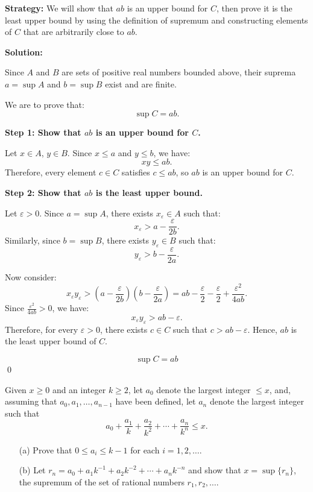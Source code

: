 \noindent\textbf{Strategy:} We will show that $ab$ is an upper bound for $C$, then prove it is the least upper bound by using the definition of supremum and constructing elements of $C$ that are arbitrarily close to $ab$.

\bigskip\noindent\textbf{Solution:}

Since \( A \) and \( B \) are sets of positive real numbers bounded above, their suprema \( a = \sup A \) and \( b = \sup B \) exist and are finite.

We are to prove that:
\[
\sup C = ab.
\]

\textbf{Step 1: Show that \( ab \) is an upper bound for \( C \).}

Let \( x \in A \), \( y \in B \). Since \( x \leq a \) and \( y \leq b \), we have:
\[
xy \leq ab.
\]
Therefore, every element \( c \in C \) satisfies \( c \leq ab \), so \( ab \) is an upper bound for \( C \).

\textbf{Step 2: Show that \( ab \) is the least upper bound.}

Let \( \varepsilon > 0 \). Since \( a = \sup A \), there exists \( x_\varepsilon \in A \) such that:
\[
x_\varepsilon > a - \frac{\varepsilon}{2b}.
\]
Similarly, since \( b = \sup B \), there exists \( y_\varepsilon \in B \) such that:
\[
y_\varepsilon > b - \frac{\varepsilon}{2a}.
\]

Now consider:
\[
x_\varepsilon y_\varepsilon > \left(a - \frac{\varepsilon}{2b}\right)\left(b - \frac{\varepsilon}{2a}\right) = ab - \frac{\varepsilon}{2} - \frac{\varepsilon}{2} + \frac{\varepsilon^2}{4ab}.
\]
Since \( \frac{\varepsilon^2}{4ab} > 0 \), we have:
\[
x_\varepsilon y_\varepsilon > ab - \varepsilon.
\]
Therefore, for every \( \varepsilon > 0 \), there exists \( c \in C \) such that \( c > ab - \varepsilon \). Hence, \( ab \) is the least upper bound of \( C \).

\[
\boxed{\sup C = ab}
\]\qed


\begin{problembox}
Given \( x \geq 0 \) and an integer \( k \geq 2 \), let \( a_0 \) denote the largest integer \( \leq x \), and, assuming that \( a_0, a_1, \dots, a_{n-1} \) have been defined, let \( a_n \) denote the largest integer such that
\[
a_0 + \frac{a_1}{k} + \frac{a_2}{k^2} + \cdots + \frac{a_n}{k^n} \leq x.
\]

\begin{enumerate}
\item[(a)] Prove that \( 0 \leq a_i \leq k - 1 \) for each \( i = 1, 2, \dots \).
\item[(b)] Let \( r_n = a_0 + a_1 k^{-1} + a_2 k^{-2} + \cdots + a_n k^{-n} \) and show that \( x = \sup \{ r_n \} \), the supremum of the set of rational numbers \( r_1, r_2, \dots \).
\end{enumerate}
\end{problembox}

